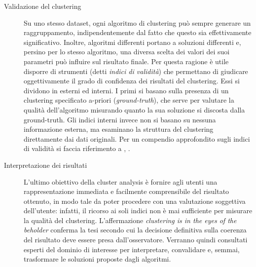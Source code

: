 \begin{description}
\item[Validazione del clustering] Su uno stesso dataset, ogni algoritmo di clustering pu\`o sempre generare un raggruppamento, indipendentemente dal fatto che questo sia effettivamente significativo. Inoltre, algoritmi differenti portano a soluzioni differenti e, persino per lo stesso algoritmo, una diversa scelta dei valori dei suoi parametri pu\`o influire sul risultato finale. Per questa ragione \`e utile disporre di strumenti (detti \textit{indici di validit\`a}) che permettano di giudicare oggettivamente il grado di confidenza dei risultati del clustering. Essi si dividono in esterni ed interni. I primi si basano sulla presenza di un clustering specificato a-priori (\textit{ground-truth}), che serve per valutare la qualit\`a dell'algoritmo misurando quanto la sua soluzione si discosta dalla ground-truth. Gli indici interni invece non si basano su nessuna informazione esterna, ma esaminano la struttura del clustering direttamente dai dati originali. Per un compendio approfondito sugli indici di validit\`a si faccia riferimento a \cite{Gordon99}, \cite{Jain88}.
\item[Interpretazione dei risultati] L'ultimo obiettivo della cluster analysis \`e fornire agli utenti una rappresentazione immediata e facilmente comprensibile del risultato ottenuto, in modo tale da poter procedere con una valutazione soggettiva dell'utente: infatti, il ricorso ai soli indici non \`e mai sufficiente per misurare la qualit\`a del clustering. L'affermazione \textit{clustering is in the eyes of the beholder} \cite{Moise2009} conferma la tesi secondo cui la decisione definitiva sulla coerenza del risultato deve essere presa dall'osservatore. Verranno quindi consultati esperti del dominio di interesse per interpretare, convalidare e, semmai, trasformare le soluzioni proposte dagli algoritmi.
\end{description}

